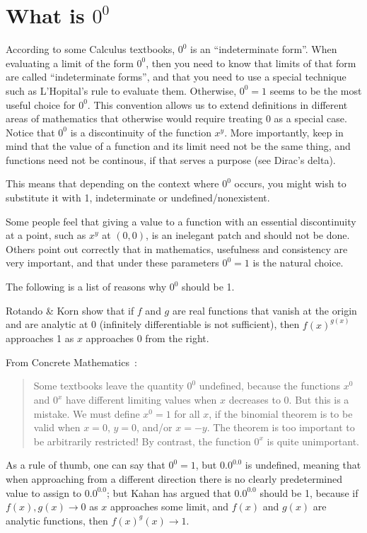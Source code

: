 \section{What is $0^0$}

According to some Calculus textbooks, $0^0$ is an ``indeterminate
form''. When evaluating a limit of the form $0^0$, then you need to know
that limits of that form are called ``indeterminate forms'', and that
you need to use a special technique such as L'Hopital's rule to evaluate
them. Otherwise, $0^0=1$ seems to be the most useful choice for
$0^0$. This convention allows us to extend definitions in different
areas of mathematics that otherwise would require treating 0 as a
special case. Notice that $0^0$ is a discontinuity of the function
$x^y$. More importantly, keep in mind that the value of a function and
its limit need not be the same thing, and functions need not be
continous, if that serves a purpose (see Dirac's delta).

This means that depending on the context where $0^0$ occurs, you might
wish to substitute it with 1, indeterminate or undefined/nonexistent.

Some people feel that giving a value to a function with an essential
discontinuity at a point, such as $x^y$ at $(0,0)$, is an inelegant
patch and should not be done. Others point out correctly that in
mathematics, usefulness and consistency are very important, and that
under these parameters $0^0=1$ is the natural choice.

The following is a list of reasons why $0^0$ should be 1.

Rotando \& Korn show that if $f$ and $g$ are real functions that vanish
at the origin and are analytic at 0 (infinitely differentiable is not
sufficient), then $f(x)^{g(x)}$ approaches 1 as $x$ approaches 0 from
the right.

From Concrete Mathematics~\cite[p. 162]{graham-knuth-patashnik-1994}:
\begin{quote}
  Some textbooks leave the quantity $0^0$ undefined, because the
  functions $x^0$ and $0^x$ have different limiting values when $x$
  decreases to 0. But this is a mistake. We must define $x^0 = 1$ for
  all $x$, if the binomial theorem is to be valid when $x=0$, $y=0$,
  and/or $x=-y$.  The theorem is too important to be arbitrarily
  restricted! By contrast, the function $0^x$ is quite unimportant.
\end{quote}

As a rule of thumb, one can say that $0^0 = 1$, but $0.0^{0.0}$ is
undefined, meaning that when approaching from a different direction
there is no clearly predetermined value to assign to $0.0^{0.0}$; but
Kahan has argued that $0.0^{0.0}$ should be 1, because if $f(x), g(x)
\rightarrow 0$ as $x$ approaches some limit, and $f(x)$ and $g(x)$ are
analytic functions, then $f(x)^g(x) \rightarrow 1$.


